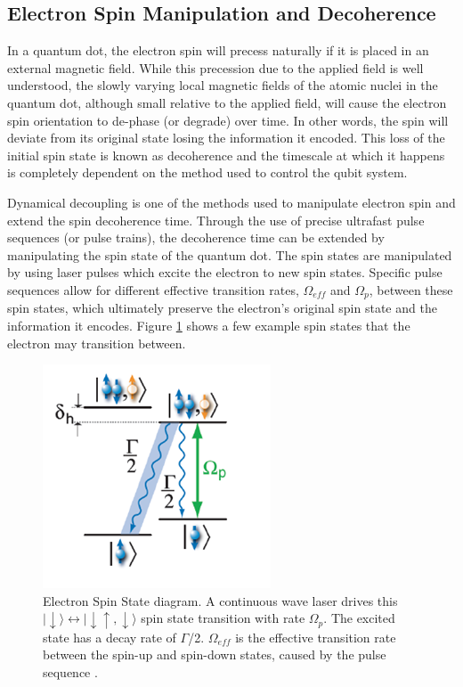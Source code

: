 \documentclass[pdftex,12pt,a4paper]{article}
\begin{document}
\subsection{Electron Spin Manipulation and Decoherence} 
In a quantum dot, the electron spin will precess naturally if it is placed in an external magnetic field. While this precession due to the applied field is well understood, the slowly varying local magnetic fields of the atomic nuclei in the quantum dot, although small relative to the applied field, will cause the electron spin orientation to de-phase (or degrade) over time. In other words, the spin will deviate from its original state losing the information it encoded. This loss of the initial spin state is known as decoherence and the timescale at which it happens is completely dependent on the method used to control the qubit system. 

Dynamical decoupling is one of the methods used to manipulate electron spin and extend the spin decoherence time. Through the use of precise ultrafast pulse sequences (or pulse trains), the decoherence time can be extended by manipulating the spin state of the quantum dot. The spin states are manipulated by using laser pulses which excite the electron to new spin states. Specific pulse sequences allow for different effective transition rates, $\Omega_{eff}$ and $\Omega_{p}$, between these spin states, which ultimately preserve the electron’s original spin state and the information it encodes. Figure \ref{fig:ElectronEnergy} shows a few example spin states that the electron may transition between.

\begin{figure}
  \centering
    \includegraphics[scale=1]{ElectronEnergyDiagram}
  \caption{Electron Spin State diagram. A continuous wave laser drives this $|\downarrow \rangle \longleftrightarrow |\downarrow \uparrow,\downarrow \rangle$ spin state transition with rate $\Omega_{p}$. The excited state has a decay rate of $\Gamma $/2. $\Omega_{eff}$  is the effective transition rate between the spin-up and spin-down states, caused by the pulse sequence \cite{Nuclear_Feedback}.}
  \label{fig:ElectronEnergy}
\end{figure}
\end{document}
